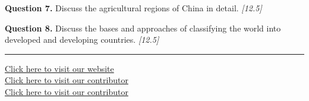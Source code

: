 \documentclass[11pt,a4paper]{article}
\newcommand{\pts}[1]{\hfill   \textit{[#1]}}
\begin{document}
\medskip


\noindent   \textbf{Question 7.} Discuss the agricultural regions of China in detail. \pts{12.5}

\medskip


\noindent   \textbf{Question 8.} Discuss the bases and approaches of classifying the world into developed and developing countries. \pts{12.5}

\vfill\rule{\linewidth}{0.4pt}

\begin{center}\small
\href{https://bhu-exam.vercel.app/}{Click here to visit our website}\\[4pt]
\href{https://me-aryan.vercel.app/}{Click here to visit our contributor}\\[4pt]
\href{https://quashan-me.vercel.app/}{Click here to visit our contributor}
\end{center}
\end{document}
